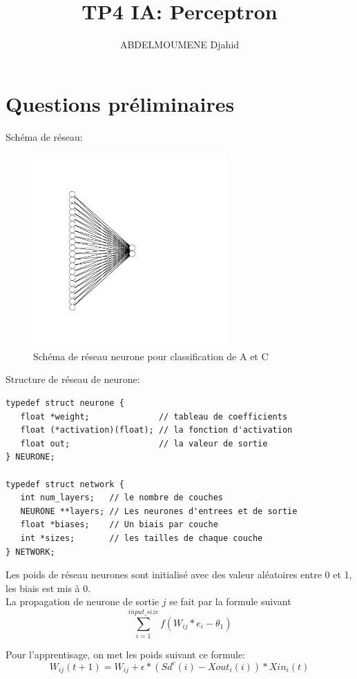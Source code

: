 \documentclass {article}
\title{TP4 IA: Perceptron}
\author{ABDELMOUMENE Djahid}
\begin{document}
\maketitle

\section{Questions préliminaires}
Schéma de réseau:
\begin{figure}[H]
   \centering
   \includegraphics[height=20em]{ACnn.pdf}
   \caption{Schéma de réseau neurone pour classification de A et C}
\end{figure}

Structure de réseau de neurone:
\begin{lstlisting}
typedef struct neurone {
   float *weight;              // tableau de coefficients 
   float (*activation)(float); // la fonction d'activation
   float out;                  // la valeur de sortie
} NEURONE;

typedef struct network {
   int num_layers;   // le nombre de couches
   NEURONE **layers; // Les neurones d'entrees et de sortie
   float *biases;    // Un biais par couche
   int *sizes;       // les tailles de chaque couche
} NETWORK;
\end{lstlisting}

Les poids de réseau neurones sont initialisé avec des valeur aléatoires entre
0 et 1, les biais est mis à 0.\\

La propagation de neurone de sortie $j$ se fait par la formule suivant
\begin{equation}
   \sum^{input\_size}_{i=1} f(W_{i j} * e_{i} - \theta_{1})
\end{equation}

Pour l'apprentisage, on met les poids suivant ce formule:
\begin{equation}
   W_{ij}(t+1) = W_{ij} + \epsilon * (Sd^c(i) - Xout_{i}(i)) * Xin_{i}(t)
\end{equation}
\end{document}
